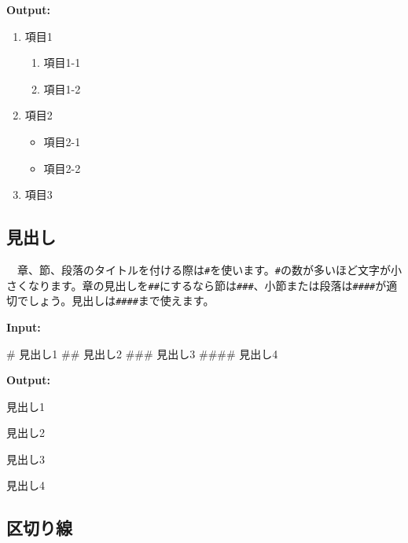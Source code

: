 \documentclass[
  a4paper,
  pandoc,
  ja=standard,
  jafont=haranoaji]{bxjsbook}
\newenvironment{Shaded}{\begin{snugshade}}{\end{snugshade}}
\newcommand{\FunctionTok}[1]{\textcolor[rgb]{0.28,0.35,0.67}{#1}}
\providecommand{\tightlist}{%
  \setlength{\itemsep}{0pt}\setlength{\parskip}{0pt}}
\begin{document}
\textbf{Output:}

\begin{enumerate}
\def\labelenumi{\arabic{enumi}.}
\tightlist
\item
  項目1

  \begin{enumerate}
  \def\labelenumii{\arabic{enumii}.}
  \tightlist
  \item
    項目1-1
  \item
    項目1-2
  \end{enumerate}
\item
  項目2

  \begin{itemize}
  \tightlist
  \item
    項目2-1
  \item
    項目2-2
  \end{itemize}
\item
  項目3
\end{enumerate}

\hypertarget{ux898bux51faux3057}{%
\subsection{見出し}\label{ux898bux51faux3057}}

　章、節、段落のタイトルを付ける際は\texttt{\#}を使います。\texttt{\#}の数が多いほど文字が小さくなります。章の見出しを\texttt{\#\#}にするなら節は\texttt{\#\#\#}、小節または段落は\texttt{\#\#\#\#}が適切でしょう。見出しは\texttt{\#\#\#\#}まで使えます。

\textbf{Input:}

\begin{Shaded}
\begin{Highlighting}[]
\FunctionTok{\# 見出し1}
\FunctionTok{\#\# 見出し2}
\FunctionTok{\#\#\# 見出し3}
\FunctionTok{\#\#\#\# 見出し4}
\end{Highlighting}
\end{Shaded}

\textbf{Output:}

見出し1

見出し2

見出し3

見出し4

\hypertarget{ux533aux5207ux308aux7dda}{%
\subsection{区切り線}\label{ux533aux5207ux308aux7dda}}
\end{document}
